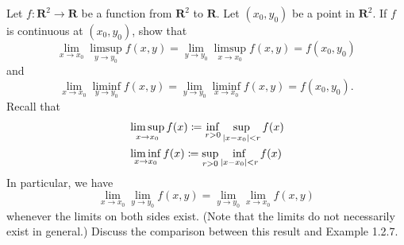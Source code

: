 \begin{exercise}\label{ex 2.2.9}
    Let \(f : \mathbf{R}^2 \to \mathbf{R}\) be a function from \(\mathbf{R}^2\) to \(\mathbf{R}\).
    Let \((x_0, y_0)\) be a point in \(\mathbf{R}^2\).
    If \(f\) is continuous at \((x_0, y_0)\), show that
    \[
        \lim_{x \to x_0} \limsup_{y \to y_0} f(x, y) = \lim_{y \to y_0} \limsup_{x \to x_0} f(x, y) = f(x_0, y_0)
    \]
    and
    \[
        \lim_{x \to x_0} \liminf_{y \to y_0} f(x, y) = \lim_{y \to y_0} \liminf_{x \to x_0} f(x, y) = f(x_0, y_0).
    \]
    Recall that
    \begin{align*}
         & \limsup_{x \to x_0} f(x) \coloneqq \inf_{r > 0} \sup_{\abs*{x - x_0} < r} f(x) \\
         & \liminf_{x \to x_0} f(x) \coloneqq \sup_{r > 0} \inf_{\abs*{x - x_0} < r} f(x)
    \end{align*}
    In particular, we have
    \[
        \lim_{x \to x_0} \lim_{y \to y_0} f(x, y) = \lim_{y \to y_0} \lim_{x \to x_0} f(x, y)
    \]
    whenever the limits on both sides exist.
    (Note that the limits do not necessarily exist in general.)
    Discuss the comparison between this result and Example 1.2.7.
\end{exercise}

